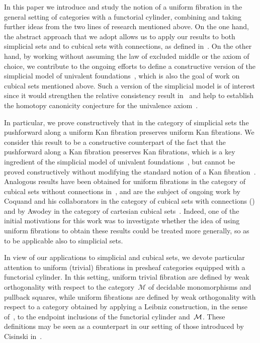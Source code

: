 \documentclass[reqno,10pt,a4paper,oneside,draft]{amsart}
\begin{document}
In this paper we introduce and study the notion of a uniform fibration in the general setting of categories with a functorial cylinder, 
combining and taking further ideas from the two lines of research mentioned above.
On the one hand, the abstract approach that we adopt allows us to apply our results to both simplicial sets and to cubical sets with connections, as defined in~\cite{coquand-variation}.
On the other hand, by working without assuming the law of excluded middle or the axiom of choice, we contribute to the
ongoing efforts to define a constructive version of the simplicial model of univalent foundations~\cite{voevodsky-simplicial-model}, which is also the goal of work on cubical sets mentioned above.
Such a version of the simplicial model is of interest since it would strengthen the relative consistency result in~\cite[Theorem~3.4.3]{voevodsky-simplicial-model} and help to establish the homotopy canonicity conjecture for the univalence axiom~\cite[Conjecture 1]{voevodsky:uf}.

In particular, we prove constructively that in the category of simplicial sets the pushforward along a uniform Kan fibration preserves uniform Kan fibrations.
We consider this result to be a constructive counterpart of the fact that the pushforward along a Kan fibration preserves Kan fibrations, which is a key ingredient of the simplicial model of univalent foundations~\cite[Lemma~2.3.1]{voevodsky-simplicial-model}, but cannot be proved constructively without modifying the standard notion of a Kan fibration~\cite{coquand-non-constructivity-kan}. Analogous results 
have been obtained for uniform fibrations in the category of cubical sets without connections in~\cite{coquand-cubical-sets,huber-thesis},
and are the subject of ongoing work by Coquand and his collaborators in the category of cubical sets with connections (\cite{coquand-face,coquand-variation,coquand-rules5}) and by Awodey in the category of cartesian cubical sets~\cite{awodey-cubical}. Indeed, one of the initial motivations for this work was to investigate whether the idea of using uniform fibrations to obtain these results could be 
treated more generally, so as to be applicable also to simplicial sets.

In view of our applications to simplicial and cubical sets, we devote particular attention to uniform (trivial) fibrations in presheaf categories equipped with a functorial cylinder.
In this setting, uniform trivial fibration are defined by weak orthogonality with respect to the category~$\mathcal{M}$ of decidable monomorphisms and pullback squares, while uniform fibrations are defined by weak orthogonality with respect to a category obtained by applying a Leibniz construction, in the sense of~\cite{riehl-verity:reedy}, to the endpoint inclusions of the functorial cylinder and~$\cal{M}$.
These definitions may be seen as a counterpart in our setting of those introduced by Cisinski in~\cite{cisinski-asterisque}.
\end{document}
